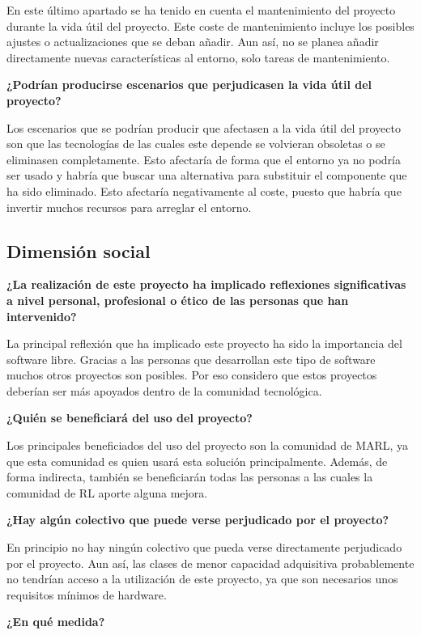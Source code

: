 En este último apartado se ha tenido en cuenta el mantenimiento del proyecto durante la vida útil del proyecto. Este coste de mantenimiento incluye los posibles ajustes o actualizaciones que se deban añadir. Aun así, no se planea añadir directamente nuevas características al entorno, solo tareas de mantenimiento.

\textbf{¿Podrían producirse escenarios que perjudicasen la vida útil del proyecto?}

Los escenarios que se podrían producir que afectasen a la vida útil del proyecto son que las tecnologías de las cuales este depende se volvieran obsoletas o se eliminasen completamente. Esto afectaría de forma que el entorno ya no podría ser usado y habría que buscar una alternativa para substituir el componente que ha sido eliminado. Esto afectaría negativamente al coste, puesto que habría que invertir muchos recursos para arreglar el entorno.

\subsection{Dimensión social}

\textbf{¿La realización de este proyecto ha implicado reflexiones significativas a nivel personal, profesional o ético de las personas que han intervenido?}

La principal reflexión que ha implicado este proyecto ha sido la importancia del software libre. Gracias a las personas que desarrollan este tipo de software muchos otros proyectos son posibles. Por eso considero que estos proyectos deberían ser más apoyados dentro de la comunidad tecnológica.

\textbf{¿Quién se beneficiará del uso del proyecto?}

Los principales beneficiados del uso del proyecto son la comunidad de MARL, ya que esta comunidad es quien usará esta solución principalmente. Además, de forma indirecta, también se beneficiarán todas las personas a las cuales la comunidad de RL aporte alguna mejora.

\textbf{¿Hay algún colectivo que puede verse perjudicado por el proyecto?}

En principio no hay ningún colectivo que pueda verse directamente perjudicado por el proyecto. Aun así, las clases de menor capacidad adquisitiva probablemente no tendrían acceso a la utilización de este proyecto, ya que son necesarios unos requisitos mínimos de hardware.

\textbf{¿En qué medida?}

